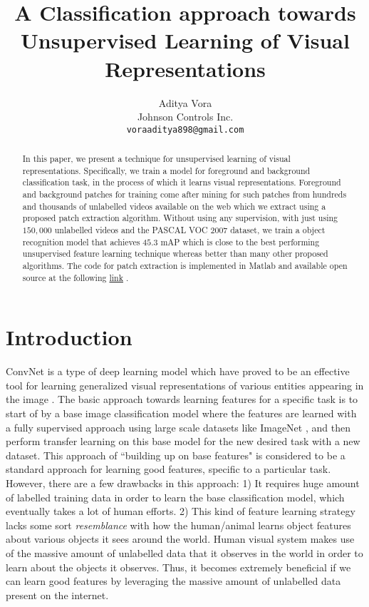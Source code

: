 \documentclass[10pt,twocolumn,letterpaper]{article}
\begin{document}
\title{A Classification approach towards Unsupervised Learning of Visual Representations}

\author{Aditya Vora\\
Johnson Controls Inc.\\
{\tt\small voraaditya898@gmail.com}
}

\maketitle


\begin{abstract}
In this paper, we present a technique for unsupervised learning of visual representations. Specifically, we train a model for foreground and background classification task, in the process of which it learns visual representations. Foreground and background patches for training come after mining for such patches from hundreds and thousands of unlabelled videos available on the web which we extract using a proposed patch extraction algorithm. Without using any supervision, with just using $150,000$ unlabelled videos and the PASCAL VOC 2007 dataset, we train a object recognition model that achieves $45.3$ mAP which is close to the best performing unsupervised feature learning technique whereas better than many other proposed algorithms. The code for patch extraction is implemented in Matlab and available open source at the following \href{https://github.com/aditya-vora/unsupervised_patch_extraction/}{link} . 
\end{abstract}


\section{Introduction}

ConvNet is a type of deep learning model which have proved to be an effective tool for learning generalized visual representations of various entities appearing in the image \cite{he2016deep, long2015fully, ren2015faster, he2017mask}. The basic approach towards learning features for a specific task is to start of by a base image classification model \cite{krizhevsky2012imagenet, he2016deep} where the features are learned with a fully supervised approach using large scale datasets like ImageNet \cite{russakovsky2015imagenet}, and then perform transfer learning on this base model for the new desired task with a new dataset. This approach of ``building up on base features" is considered to be a standard approach for learning good features, specific to a particular task. However, there are a few drawbacks in this approach: 1) It requires huge amount of labelled training data in order to learn the base classification model, which eventually takes a lot of human efforts. 2) This kind of feature learning strategy lacks some sort \textit{resemblance} with how the human/animal learns object features about various objects it sees around the world. Human visual system makes use of the massive amount of unlabelled data that it observes in the world in order to learn about the objects it observes. Thus, it becomes extremely beneficial if we can learn good features by leveraging the massive amount of unlabelled data present on the internet.
\end{document}

